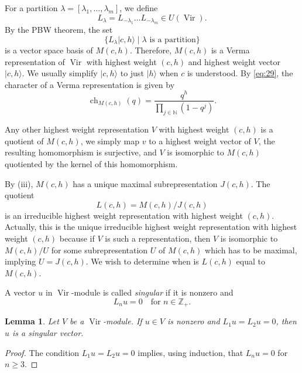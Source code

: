 \documentclass[a4paper, 12pt, reqno]{amsart}
\newtheorem{lemma}[theorem]{Lemma}
\theoremstyle{remark}
\numberwithin{equation}{subsection}
\DeclareMathOperator{\Vir}{Vir}
\DeclareMathOperator{\ch}{ch}
\begin{document}
For a partition $\lambda = [\lambda_1, \dots, \lambda_m]$, we define
\begin{equation*}
  L_{\lambda} = L_{-\lambda_1}\dots L_{-\lambda_m} \in U(\Vir).
\end{equation*}
By the PBW theorem, the set
\begin{equation*}
  \{L_{\lambda}|c, h\rangle \mid \lambda\text{ is a partition}\}
\end{equation*}
is a vector space basis of $M(c, h)$.
Therefore, $M(c, h)$ is a Verma representation of $\Vir$ with highest weight $(c, h)$ and highest weight vector $|c, h\rangle$.
We usually simplify $|c, h\rangle$ to just $|h\rangle$ when $c$ is understood.
By \eqref{eq:29}, the character of a Verma representation is given by
\begin{equation*}
  \ch_{M(c, h)}(q) = \frac{q^h}{\prod_{j \in \mathbb{N}}(1 - q^j)}.
\end{equation*}

Any other highest weight representation $V$ with highest weight $(c, h)$ is a quotient of $M(c, h)$, we simply  map $v$ to a highest weight vector of $V$, the resulting homomorphism is surjective, and $V$ is isomorphic to $M(c, h)$ quotiented by the kernel of this homomorphism.

By (iii), $M(c, h)$ has a unique maximal subrepresentation $J(c, h)$.
The quotient
\begin{equation*}
  L(c, h) = M(c, h)/J(c, h)
\end{equation*}
is an irreducible highest weight representation with highest weight $(c, h)$.
Actually, this is the unique irreducible highest weight representation with highest weight $(c, h)$ because if $V$ is such a representation, then $V$ is isomorphic to $M(c, h)/U$ for some subrepresentation $U$ of $M(c, h)$ which has to be maximal, implying $U = J(c, h)$.
We wish to determine when is $L(c, h)$ equal to $M(c, h)$.

A vector $u$ in $\Vir$-module is called \emph{singular} if it is nonzero and
\begin{equation*}
  L_nu = 0 \quad \text{for }n \in \mathbb{Z}_+.
\end{equation*}

\begin{lemma}
  \label{lmm:18}
  Let $V$ be a $\Vir$-module.
  If $u \in V$ is nonzero and $L_1u = L_2u = 0$, then $u$ is a singular vector.
\end{lemma}

\begin{proof}
  The condition $L_1u = L_2u = 0$ implies, using induction, that $L_nu = 0$ for $n \ge 3$.
\end{proof}
\end{document}

